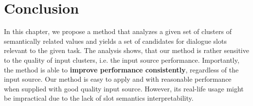 \section{Conclusion}
In this chapter, we propose a method that analyzes a given set of clusters of semantically related values and yields a set of candidates for dialogue slots relevant to the given task.
The analysis shows, that our method is rather sensitive to the  quality of input clusters, i.e. the input source performance.
Importantly, the method is able to \textbf{improve performance consistently}, regardless of the input source.
Our method is easy to apply and with reasonable performance when supplied with good quality input source.
However, its real-life usage might be impractical due to the lack of slot semantics interpretability.